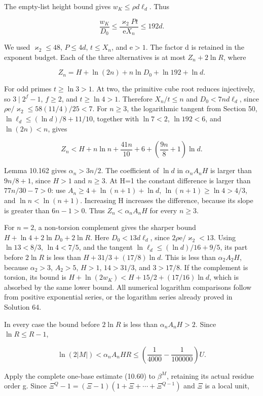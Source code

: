 \documentclass[
  11pt,
  a4paper,
]{article}
\begin{document}
The empty-list height bound gives \(w_K\le\rho d\ell_d\). Thus

\[
\frac{w_K}{D_0}\le\frac{\varkappa_2Pt}{\mathrm eX_n}
\le192d.
\tag{10.536}
\]

We used \(\varkappa_2\le48\), \(P\le4d\), \(t\le X_n\), and
\(\mathrm e>1\). The factor d is retained in the exponent budget. Each
of the three alternatives is at most \(Z_n+2\ln R\), where

\[
Z_n=H+\ln(2n)+n\ln D_0+\ln192+\ln d.
\tag{10.537}
\]

For odd primes \(t\ge\ln3>1\). At two, the primitive cube root reduces
injectively, so \(3\mid2^f-1\), \(f\ge2\), and \(t\ge\ln4>1\). Therefore
\(X_n/t\le n\) and \(D_0<7nd\ell_d\), since
\(\rho\mathrm e/\varkappa_2\le58(11/4)/25<7\). For \(n\ge3\), the
logarithmic tangent from Section 50, \(\ln\ell_d\le(\ln d)/8+11/10\),
together with \(\ln7<2\), \(\ln192<6\), and \(\ln(2n)<n\), gives

\[
Z_n<H+n\ln n+\frac{41n}{10}+6
       +\left(\frac{9n}{8}+1\right)\ln d.
\tag{10.538}
\]

Lemma 10.162 gives \(\alpha_n>3n/2\). The coefficient of \(\ln d\) in
\(\alpha_nA_nH\) is larger than \(9n/8+1\), since \(H>1\) and \(n\ge3\).
At H=1 the constant difference is larger than \(77n/30-7>0\): use
\(A_n\ge4+\ln(n+1)+\ln d\), \(\ln(n+1)\ge\ln4>4/3\), and
\(\ln n<\ln(n+1)\). Increasing H increases the difference, because its
slope is greater than \(6n-1>0\). Thus \(Z_n<\alpha_nA_nH\) for every
\(n\ge3\).

For \(n=2\), a non-torsion complement gives the sharper bound
\(H+\ln4+2\ln D_0+2\ln R\). Here \(D_0<13d\ell_d\), since
\(2\rho\mathrm e/\varkappa_2<13\). Using \(\ln13<8/3\), \(\ln4<7/5\),
and the tangent \(\ln\ell_d\le(\ln d)/16+9/5\), its part before
\(2\ln R\) is less than \(H+31/3+(17/8)\ln d\). This is less than
\(\alpha_2A_2H\), because \(\alpha_2>3\), \(A_2>5\), \(H>1\),
\(14>31/3\), and \(3>17/8\). If the complement is torsion, its bound is
\(H+\ln(2w_K)<H+15/2+(17/16)\ln d\), which is absorbed by the same lower
bound. All numerical logarithm comparisons follow from positive
exponential series, or the logarithm series already proved in Solution
64.

In every case the bound before \(2\ln R\) is less than
\(\alpha_nA_nH>2\). Since \(\ln R\le R-1\),

\[
\ln(2|M|)<\alpha_nA_nHR
\le\left(\frac1{4000}-\frac1{100000}\right)U.
\tag{10.539}
\]

Apply the complete one-base estimate (10.60) to \(\beta^M\), retaining
its actual residue order g. Since
\(\Xi^Q-1=(\Xi-1)(1+\Xi+\cdots+\Xi^{Q-1})\) and \(\Xi\) is a local unit,
\end{document}
